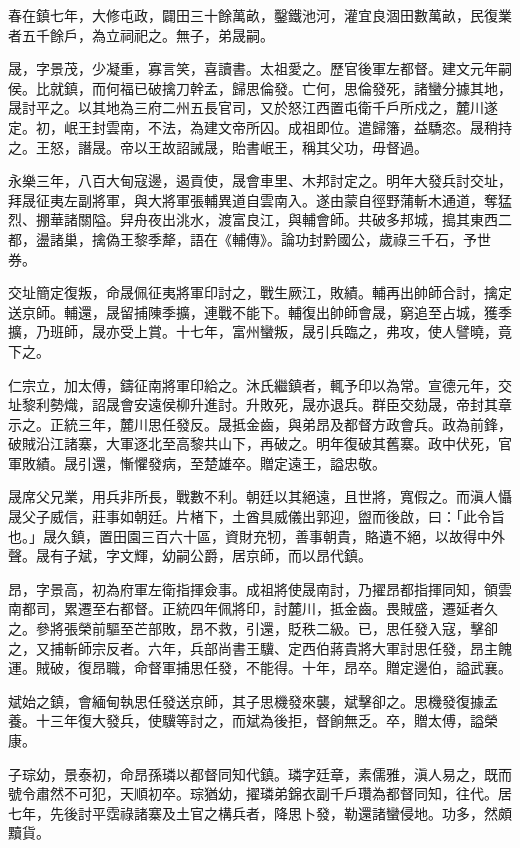 \begin{pinyinscope}
春在鎮七年，大修屯政，闢田三十餘萬畝，鑿鐵池河，灌宜良涸田數萬畝，民復業者五千餘戶，為立祠祀之。無子，弟晟嗣。

晟，字景茂，少凝重，寡言笑，喜讀書。太祖愛之。歷官後軍左都督。建文元年嗣侯。比就鎮，而何福已破擒刀幹孟，歸思倫發。亡何，思倫發死，諸蠻分據其地，晟討平之。以其地為三府二州五長官司，又於怒江西置屯衛千戶所戍之，麓川遂定。初，岷王封雲南，不法，為建文帝所囚。成祖即位。遣歸籓，益驕恣。晟稍持之。王怒，譖晟。帝以王故詔誡晟，貽書岷王，稱其父功，毋督過。

永樂三年，八百大甸寇邊，遏貢使，晟會車里、木邦討定之。明年大發兵討交址，拜晟征夷左副將軍，與大將軍張輔異道自雲南入。遂由蒙自徑野蒲斬木通道，奪猛烈、掤華諸關隘。舁舟夜出洮水，渡富良江，與輔會師。共破多邦城，搗其東西二都，盪諸巢，擒偽王黎季犛，語在《輔傳》。論功封黔國公，歲祿三千石，予世券。

交址簡定復叛，命晟佩征夷將軍印討之，戰生厥江，敗績。輔再出帥師合討，擒定送京師。輔還，晟留捕陳季擴，連戰不能下。輔復出帥師會晟，窮追至占城，獲季擴，乃班師，晟亦受上賞。十七年，富州蠻叛，晟引兵臨之，弗攻，使人譬曉，竟下之。

仁宗立，加太傅，鑄征南將軍印給之。沐氏繼鎮者，輒予印以為常。宣德元年，交址黎利勢熾，詔晟會安遠侯柳升進討。升敗死，晟亦退兵。群臣交劾晟，帝封其章示之。正統三年，麓川思任發反。晟抵金齒，與弟昂及都督方政會兵。政為前鋒，破賊沿江諸寨，大軍逐北至高黎共山下，再破之。明年復破其舊寨。政中伏死，官軍敗績。晟引還，慚懼發病，至楚雄卒。贈定遠王，謚忠敬。

晟席父兄業，用兵非所長，戰數不利。朝廷以其絕遠，且世將，寬假之。而滇人懾晟父子威信，莊事如朝廷。片楮下，土酋具威儀出郭迎，盥而後啟，曰：「此令旨也。」晟久鎮，置田園三百六十區，資財充牣，善事朝貴，賂遺不絕，以故得中外聲。晟有子斌，字文輝，幼嗣公爵，居京師，而以昂代鎮。

昂，字景高，初為府軍左衛指揮僉事。成祖將使晟南討，乃擢昂都指揮同知，領雲南都司，累遷至右都督。正統四年佩將印，討麓川，抵金齒。畏賊盛，遷延者久之。參將張榮前驅至芒部敗，昂不救，引還，貶秩二級。已，思任發入寇，擊卻之，又捕斬師宗反者。六年，兵部尚書王驥、定西伯蔣貴將大軍討思任發，昂主餽運。賊破，復昂職，命督軍捕思任發，不能得。十年，昂卒。贈定邊伯，謚武襄。

斌始之鎮，會緬甸執思任發送京師，其子思機發來襲，斌擊卻之。思機發復據孟養。十三年復大發兵，使驥等討之，而斌為後拒，督餉無乏。卒，贈太傅，謚榮康。

子琮幼，景泰初，命昂孫璘以都督同知代鎮。璘字廷章，素儒雅，滇人易之，既而號令肅然不可犯，天順初卒。琮猶幼，擢璘弟錦衣副千戶瓚為都督同知，往代。居七年，先後討平霑祿諸寨及土官之構兵者，降思卜發，勒還諸蠻侵地。功多，然頗黷貨。


\end{pinyinscope}
